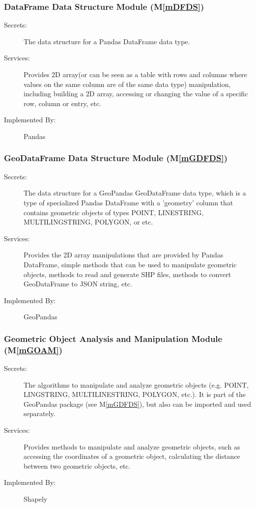 \documentclass[12pt, titlepage]{article}
\newcommand{\mref}[1]{M\ref{#1}}
\begin{document}
\subsubsection{DataFrame Data Structure Module (\mref{mDFDS})}

\begin{description}
\item[Secrets:]The data structure for a Pandas DataFrame data type.
\item[Services:] Provides 2D array(or can be seen as a table with rows and columns where values on the same column are of the same data type) manipulation, including building a 2D array, accessing or changing the value of a specific row, column or entry, etc.
\item[Implemented By:] Pandas
\end{description}

\subsubsection{GeoDataFrame Data Structure Module (\mref{mGDFDS})}

\begin{description}
\item[Secrets:]The data structure for a GeoPandas GeoDataFrame data type, which is a type of specialized Pandas DataFrame with a 'geometry' column that contains geometric objects of types POINT, LINESTRING, MULTILINGSTRING, POLYGON, or etc.
\item[Services:] Provides the 2D array manipulations that are provided by Pandas DataFrame, simple methods that can be used to manipulate geometric objects, methods to read and generate SHP files, methods to convert GeoDataFrame to JSON string, etc.
\item[Implemented By:] GeoPandas
\end{description}

\subsubsection{Geometric Object Analysis and Manipulation Module (\mref{mGOAM})}

\begin{description}
\item[Secrets:]The algorithms to manipulate and analyze geometric objects (e.g. POINT, LINGSTRING, MULTILINESTRING, POLYGON, etc.). It is part of the GeoPandas package (see \mref{mGDFDS}), but also can be imported and used separately.
\item[Services:] Provides methods to manipulate and analyze geometric objects, such as accessing the coordinates of a geometric object, calculating the distance between two geometric objects, etc.
\item[Implemented By:] Shapely
\end{description}
\end{document}
